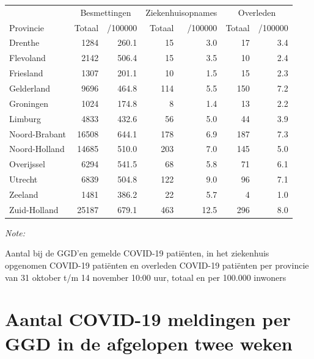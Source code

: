 \documentclass[
  english,
  man,floatsintext]{apa6}
\begin{document}
\begin{table}[H]
\centering
\begin{threeparttable}
\begin{tabular}{lrrrrrr}
\toprule
\multicolumn{1}{c}{ } & \multicolumn{2}{c}{Besmettingen} & \multicolumn{2}{c}{Ziekenhuisopnames} & \multicolumn{2}{c}{Overleden} \\
\cmidrule(l{3pt}r{3pt}){2-3} \cmidrule(l{3pt}r{3pt}){4-5} \cmidrule(l{3pt}r{3pt}){6-7}
Provincie & Totaal & /100000 & Totaal & /100000 & Totaal & /100000\\
\midrule
Drenthe & 1284 & 260.1 & 15 & 3.0 & 17 & 3.4\\
Flevoland & 2142 & 506.4 & 15 & 3.5 & 10 & 2.4\\
Friesland & 1307 & 201.1 & 10 & 1.5 & 15 & 2.3\\
Gelderland & 9696 & 464.8 & 114 & 5.5 & 150 & 7.2\\
Groningen & 1024 & 174.8 & 8 & 1.4 & 13 & 2.2\\
Limburg & 4833 & 432.6 & 56 & 5.0 & 44 & 3.9\\
Noord-Brabant & 16508 & 644.1 & 178 & 6.9 & 187 & 7.3\\
Noord-Holland & 14685 & 510.0 & 203 & 7.0 & 145 & 5.0\\
Overijssel & 6294 & 541.5 & 68 & 5.8 & 71 & 6.1\\
Utrecht & 6839 & 504.8 & 122 & 9.0 & 96 & 7.1\\
Zeeland & 1481 & 386.2 & 22 & 5.7 & 4 & 1.0\\
Zuid-Holland & 25187 & 679.1 & 463 & 12.5 & 296 & 8.0\\
\bottomrule
\end{tabular}
\begin{tablenotes}
\item \textit{Note: } 
\item Aantal bij de GGD’en gemelde COVID-19 patiënten, in het ziekenhuis opgenomen COVID-19 patiënten en overleden COVID-19 patiënten per provincie van 31 oktober t/m 14 november 10:00 uur, totaal en per 100.000 inwoners
\end{tablenotes}
\end{threeparttable}
\end{table}

\newpage

\hypertarget{aantal-covid-19-meldingen-per-ggd-in-de-afgelopen-twee-weken}{%
\section{Aantal COVID-19 meldingen per GGD in de afgelopen twee weken}\label{aantal-covid-19-meldingen-per-ggd-in-de-afgelopen-twee-weken}}
\end{document}
